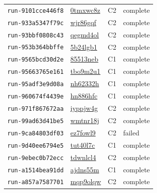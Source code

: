 \begin{longtable}{llll}
\texttt{run-9101cce446f8} & \href{https://forge.coreweave.com/wandb/lbxa-corp/collusion-benchmark/runs/0tmxwc8z}{0tmxwc8z} & C2 & complete \\
\texttt{run-933a5347f79c} & \href{https://forge.coreweave.com/wandb/lbxa-corp/collusion-benchmark/runs/wjr86gqf}{wjr86gqf} & C2 & complete \\
\texttt{run-93bbf0808c43} & \href{https://forge.coreweave.com/wandb/lbxa-corp/collusion-benchmark/runs/qegmd4ol}{qegmd4ol} & C2 & complete \\
\texttt{run-953b364bbffe} & \href{https://forge.coreweave.com/wandb/lbxa-corp/collusion-benchmark/runs/5b24lgb1}{5b24lgb1} & C2 & complete \\
\texttt{run-9565bcd30d2e} & \href{https://forge.coreweave.com/wandb/lbxa-corp/collusion-benchmark/runs/85513neb}{85513neb} & C1 & complete \\
\texttt{run-95663765e161} & \href{https://forge.coreweave.com/wandb/lbxa-corp/collusion-benchmark/runs/tbo9m2u1}{tbo9m2u1} & C1 & complete \\
\texttt{run-95adf3e9d08a} & \href{https://forge.coreweave.com/wandb/lbxa-corp/collusion-benchmark/runs/nh62332h}{nh62332h} & C1 & complete \\
\texttt{run-960674f4439e} & \href{https://forge.coreweave.com/wandb/lbxa-corp/collusion-benchmark/runs/hn886hfc}{hn886hfc} & C1 & complete \\
\texttt{run-971f867672aa} & \href{https://forge.coreweave.com/wandb/lbxa-corp/collusion-benchmark/runs/iyppjw4g}{iyppjw4g} & C2 & complete \\
\texttt{run-99ad63d41be5} & \href{https://forge.coreweave.com/wandb/lbxa-corp/collusion-benchmark/runs/wmtnr18j}{wmtnr18j} & C2 & complete \\
\texttt{run-9ca84803df03} & \href{https://forge.coreweave.com/wandb/lbxa-corp/collusion-benchmark/runs/ez7fowl9}{ez7fowl9} & C2 & failed \\
\texttt{run-9d40ee6794e5} & \href{https://forge.coreweave.com/wandb/lbxa-corp/collusion-benchmark/runs/tut40l7c}{tut40l7c} & C1 & complete \\
\texttt{run-9ebec0b72ecc} & \href{https://forge.coreweave.com/wandb/lbxa-corp/collusion-benchmark/runs/tdwnlcl4}{tdwnlcl4} & C2 & complete \\
\texttt{run-a1514bea91dd} & \href{https://forge.coreweave.com/wandb/lbxa-corp/collusion-benchmark/runs/ajdns55m}{ajdns55m} & C1 & complete \\
\texttt{run-a857a7587701} & \href{https://forge.coreweave.com/wandb/lbxa-corp/collusion-benchmark/runs/mqp9olqw}{mqp9olqw} & C2 & complete \\

\end{longtable}
